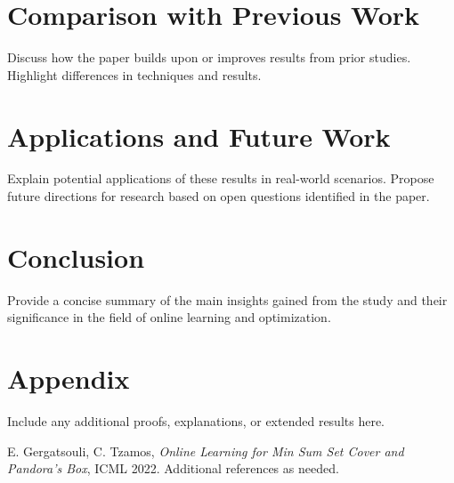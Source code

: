 \documentclass[11pt,a4paper]{article}
\begin{document}
\section{Comparison with Previous Work}
Discuss how the paper builds upon or improves results from prior studies. Highlight differences in techniques and results.

\section{Applications and Future Work}
Explain potential applications of these results in real-world scenarios. Propose future directions for research based on open questions identified in the paper.

\section{Conclusion}
Provide a concise summary of the main insights gained from the study and their significance in the field of online learning and optimization.

\appendix
\section{Appendix}
Include any additional proofs, explanations, or extended results here.

\begin{thebibliography}{9}
 E. Gergatsouli, C. Tzamos, \textit{Online Learning for Min Sum Set Cover and Pandora’s Box}, ICML 2022.
 Additional references as needed.
\end{thebibliography}
\end{document}
